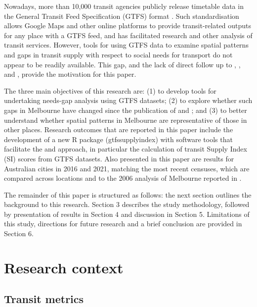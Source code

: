 \documentclass[preprint, 3p,
authoryear]{elsarticle} %
\begin{document}
Nowadays, more than 10,000 transit agencies publicly release timetable
data in the General Transit Feed Specification (GTFS) format
\citep{GTFS}. Such standardisation allows Google Maps and other online
platforms to provide transit-related outputs for any place with a GTFS
feed, and has facilitated research and other analysis of transit
services. However, tools for using GTFS data to examine spatial patterns
and gaps in transit supply with respect to social needs for transport do
not appear to be readily available. This gap, and the lack of direct
follow up to \citet{Currie2003Hobart}, \citet{Currie2004Gap},
\citet{Currie2007Identifying} and \citet{currie2010identifying}, provide
the motivation for this paper.

The three main objectives of this research are: (1) to develop tools for
undertaking needs-gap analysis using GTFS datasets; (2) to explore
whether such gaps in Melbourne have changed since the publication of
\citet{Currie2007Identifying} and \citet{currie2010identifying}; and (3)
to better understand whether spatial patterns in Melbourne are
representative of those in other places. Research outcomes that are
reported in this paper include the development of a new R package
(gtfssupplyindex) with software tools that facilitate the
\citet{Currie2007Identifying} and \citet{currie2010identifying}
approach, in particular the calculation of transit Supply Index (SI)
scores from GTFS datasets. Also presented in this paper are results for
Australian cities in 2016 and 2021, matching the most recent censuses,
which are compared across locations and to the 2006 analysis of
Melbourne reported in \citet{currie2010identifying}.

The remainder of this paper is structured as follows: the next section
outlines the background to this research. Section 3 describes the study
methodology, followed by presentation of results in Section 4 and
discussion in Section 5. Limitations of this study, directions for
future research and a brief conclusion are provided in Section 6.

\section{Research context}\label{research-context}

\subsection{Transit metrics}\label{transit-metrics}
\end{document}
